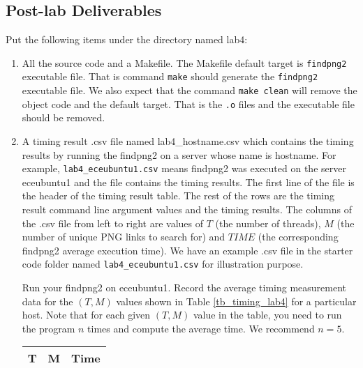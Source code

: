 \subsection{Post-lab Deliverables}
\label{sec:lab4:postlab}
Put the following items under the directory named lab4:
\begin{enumerate}
\item All the source code and a Makefile. The Makefile default target is \verb+findpng2+ executable file. That is command \verb+make+ should generate the \verb+findpng2+ executable file. We also expect that the command \verb+make clean+ will remove the object code and the default target. That is the \verb+.o+ files and the executable file should be removed.
\item A timing result .csv file named lab4\_hostname.csv 
  which contains the timing results by running the findpng2 on a server whose name is hostname. For example, \verb+lab4_eceubuntu1.csv+ means findpng2 was executed on the server eceubuntu1 and the file contains the timing results.
  The first line of the file is the header of the timing result table. The rest of the rows are the timing result command line argument values and the timing results. The columns of the .csv file from left to right are values of $T$ (the number of threads), $M$ (the number of unique PNG links to search for) and $TIME$ (the corresponding findpng2 average execution time). We have an example .csv file in the starter code folder named \verb+lab4_eceubuntu1.csv+ for illustration purpose.

  Run your findpng2 on eceubuntu1. Record the average timing measurement data for the $(T, M)$ values shown in Table \ref{tb_timing_lab4} for a particular host. Note that for each given $(T, M)$ value in the table, you need to run the program $n$ times and compute the average time. We recommend $n=5$.
\begin{table}[H]
\begin{center}
\begin{tabular}{|c|c|c|}
\hline
T     & M    & Time \\ \hline


\end{tabular}
\end{center}
\end{table}
\end{enumerate}
